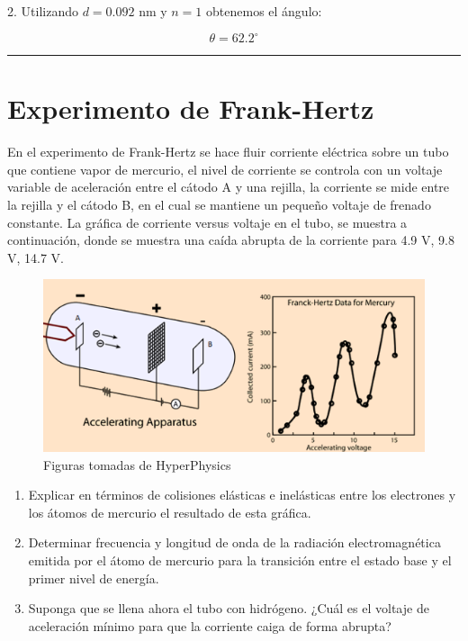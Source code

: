 \documentclass[12pt]{article}
\begin{document}
2. Utilizando $d=0.092$ nm y $n=1$ obtenemos el ángulo:

\begin{equation*}
\theta = 62.2^{\circ}
\end{equation*}

\noindent\rule{16.5cm}{0.4pt}

\section{Experimento de Frank-Hertz}

En el experimento de Frank-Hertz se hace fluir corriente eléctrica sobre un tubo que contiene
vapor de mercurio, el nivel de corriente se controla con un voltaje variable de aceleración entre el
cátodo A y una rejilla, la corriente se mide entre la rejilla y el cátodo B, en el cual se mantiene un
pequeño voltaje de frenado constante. La gráfica de corriente versus voltaje en el tubo, se muestra
a continuación, donde se muestra una caída abrupta de la corriente para 4.9 V, 9.8 V, 14.7 V.

	\begin{figure}[h!]
		\centering
	\includegraphics[scale=1, angle=0]{frank}
	\caption{Figuras tomadas de HyperPhysics}
\end{figure}

\begin{enumerate}
	\item Explicar en términos de colisiones elásticas e inelásticas entre los electrones y los átomos de
	mercurio el resultado de esta gráfica.
	\item  Determinar frecuencia y longitud de onda de la radiación electromagnética emitida por el átomo
	de mercurio para la transición entre el estado base y el primer nivel de energía.
	\item Suponga que se llena ahora el tubo con hidrógeno. ¿Cuál es el voltaje de aceleración mínimo para que la
	corriente caiga de forma abrupta?
\end{enumerate}
\end{document}
